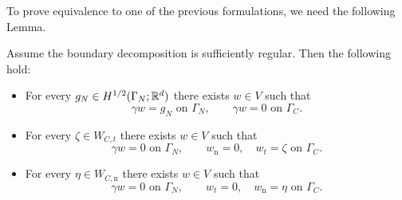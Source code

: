 To prove equivalence to one of the previous formulations, we need the following Lemma.

\begin{lemma}\label{lem:locboundlift}
	Assume the boundary decomposition is sufficiently regular. Then the following hold:
	\begin{itemize}
		\item[(i)] For every $g_N\in H^{1/2}(\Gamma_N;{\mathbb R}^d)$ there exists $w\in V$ such that
		      \begin{equation*}
			      \gamma w=g_N \text{ on }\Gamma_N,
			      \qquad
			      \gamma w=0 \text{ on }\Gamma_C.
		      \end{equation*}
		\item[(ii)] For every $\zeta\in W_{C,t}$ there exists $w\in V$ such that
		      \begin{equation*}
			      \gamma w=0 \text{ on }\Gamma_N,
			      \qquad
			      w_\mathrm{n}=0,\quad w_t=\zeta \text{ on }\Gamma_C.
		      \end{equation*}
		\item[(iii)] For every $\eta\in W_{C,\mathrm{n}}$ there exists $w\in V$ such that
		      \begin{equation*}
			      \gamma w=0 \text{ on }\Gamma_N,
			      \qquad
			      w_t=0,\quad w_\mathrm{n}=\eta \text{ on }\Gamma_C.
		      \end{equation*}
	\end{itemize}
\end{lemma}
